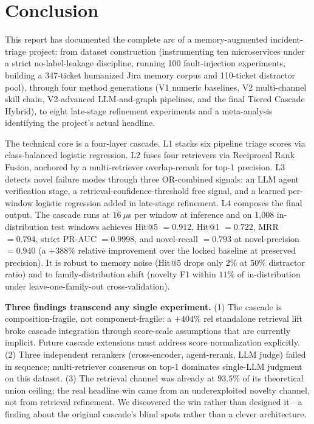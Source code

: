 \section{Conclusion}
\label{sec:conclusion}

This report has documented the complete arc of a memory-augmented incident-triage project: from dataset construction (instrumenting ten microservices under a strict no-label-leakage discipline, running 100 fault-injection experiments, building a 347-ticket humanized Jira memory corpus and 110-ticket distractor pool), through four method generations (V1 numeric baselines, V2 multi-channel skill chain, V2-advanced LLM-and-graph pipelines, and the final Tiered Cascade Hybrid), to eight late-stage refinement experiments and a meta-analysis identifying the project's actual headline.

The technical core is a four-layer cascade. L1 stacks six pipeline triage scores via class-balanced logistic regression. L2 fuses four retrievers via Reciprocal Rank Fusion, anchored by a multi-retriever overlap-rerank for top-1 precision. L3 detects novel failure modes through three OR-combined signals: an LLM agent verification stage, a retrieval-confidence-threshold free signal, and a learned per-window logistic regression added in late-stage refinement. L4 composes the final output. The cascade runs at $16~\mu$s per window at inference and on 1{,}008 in-distribution test windows achieves Hit@5 $= 0.912$, Hit@1 $= 0.722$, MRR $= 0.794$, strict PR-AUC $= 0.9998$, and novel-recall $= 0.793$ at novel-precision $= 0.940$ (a $+388\%$ relative improvement over the locked baseline at preserved precision). It is robust to memory noise (Hit@5 drops only $2\%$ at $50\%$ distractor ratio) and to family-distribution shift (novelty F1 within $11\%$ of in-distribution under leave-one-family-out cross-validation).

\textbf{Three findings transcend any single experiment.} (1) The cascade is composition-fragile, not component-fragile: a $+404\%$ rel standalone retrieval lift broke cascade integration through score-scale assumptions that are currently implicit. Future cascade extensions must address score normalization explicitly. (2) Three independent rerankers (cross-encoder, agent-rerank, LLM judge) failed in sequence; multi-retriever consensus on top-1 dominates single-LLM judgment on this dataset. (3) The retrieval channel was already at $93.5\%$ of its theoretical union ceiling; the real headline win came from an underexploited novelty channel, not from retrieval refinement. We discovered the win rather than designed it---a finding about the original cascade's blind spots rather than a clever architecture.

